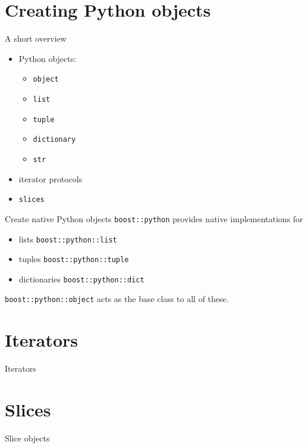 
\section{Creating Python objects}
\begin{frame}{A short overview}
    \begin{itemize}
        \item Python objects: 
            \begin{itemize}
                \item \texttt{object}
                \item \texttt{list}
                \item \texttt{tuple}
                \item \texttt{dictionary}
                \item \texttt{str}
            \end{itemize}
        \item iterator protocols
        \item \texttt{slices}
    \end{itemize}
\end{frame}

\begin{frame}[fragile]{Create native Python objects}
    \texttt{boost::python} provides native implementations for 
    \begin{itemize}
        \item lists \texttt{boost::python::list}
        \item tuples \texttt{boost::python::tuple}
        \item dictionaries \texttt{boost::python::dict}
    \end{itemize}
    \vspace{0.05\textheight}
    \begin{center}
        
    \end{center}
    \vspace{0.05\textheight}
    \texttt{boost::python::object} acts as the base class to all of these.
\end{frame}


\section{Iterators}
\begin{frame}{Iterators}

\end{frame}


\section{Slices}
\begin{frame}{Slice objects}

\end{frame}
